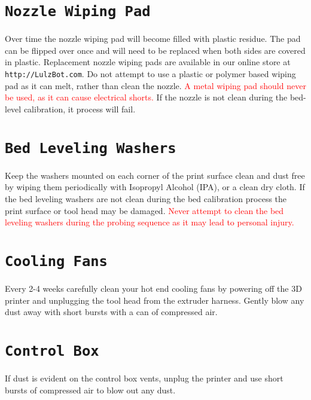 \section{\texttt{Nozzle Wiping Pad}}
Over time the nozzle wiping pad will become filled with plastic residue. The pad can be flipped over once and will need to be replaced when both sides are covered in plastic. Replacement nozzle wiping pads are available in our online store at \texttt{http://LulzBot.com}. Do not attempt to use a plastic or polymer based wiping pad as it can melt, rather than clean the nozzle. \textcolor{red}{A metal wiping pad should never be used, as it can cause electrical shorts.} If the nozzle is not clean during the bed-level calibration, it process will fail.

\section{\texttt{Bed Leveling Washers}}
Keep the washers mounted on each corner of the print surface clean and dust free by wiping them periodically with Isopropyl Alcohol (IPA), or a clean dry cloth. If the bed leveling washers are not clean during the bed calibration process the print surface or tool head may be damaged. \textcolor{red}{Never attempt to clean the bed leveling washers during the probing sequence as it may lead to personal injury.}

\section{\texttt{Cooling Fans}}
Every 2-4 weeks carefully clean your hot end cooling fans by powering off the 3D printer and unplugging the tool head from the extruder harness. Gently blow any dust away with short bursts with a can of compressed air. 


\section{\texttt{Control Box}}
If dust is evident on the control box vents, unplug the printer and use short bursts of compressed air to blow out any dust.
